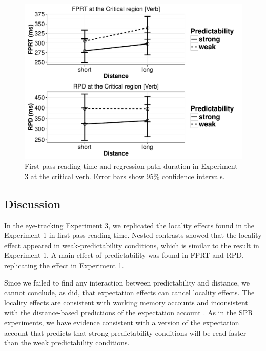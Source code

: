 \documentclass{frontiersSCNS}\usepackage{knitr} %
\begin{document}
\begin{figure}[!htbp]
\begin{center}
\begin{knitrout}
\color{fgcolor}

{\centering \includegraphics[width=\maxwidth]{Figures/SafaviEtAlfigureplotsET1-1} 

}



\end{knitrout}
\caption{First-pass reading time and regression path duration in Experiment 3 at the critical verb. Error bars show 95\% confidence intervals.}\label{fig:ET1interaction-TFT}
\end{center}
\end{figure}

\subsection{Discussion}

In the eye-tracking Experiment 3, we replicated the locality effects found in the Experiment 1 in first-pass reading time. Nested contrasts showed that the  locality effect appeared in weak-predictability conditions, which is similar to the result in Experiment 1. 
A main effect of predictability was found in FPRT and RPD, replicating the effect in Experiment 1.  

 Since we failed to find any interaction between predictability and distance, we cannot conclude, as \citet{husain2014strong} did,  that expectation effects can cancel locality effects. The locality effects are consistent with working memory accounts \citep{gibson2000dependency,lewis2005activation} and inconsistent with the distance-based predictions of the expectation account \citep{levy2008expectation}. As in the SPR experiments, we have evidence consistent with a version of the expectation account  that predicts that strong predictability conditions will be read faster than the weak predictability conditions.
\end{document}
